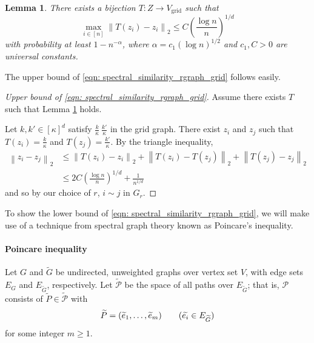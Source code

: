 \documentclass{article}
\newcommand{\norm}[1]{\left\lVert#1\right\rVert}
\newcommand{\1}{\mathbb{I}}
\newcommand{\Z}{Z} %
\newcommand{\grid}{\mathrm{grid}}
\theoremstyle{alden}
\theoremstyle{aldenthm}
\newtheorem{lemma}{Lemma}
\theoremstyle{definition}
\theoremstyle{remark}
\begin{document}
\begin{lemma}
	\label{lem: mass_transport_mapping}
	There exists a bijection $T: \Z \to V_{\grid}$ such that
	\begin{equation*}
	\max_{i \in [n]} \norm{T(z_i) - z_i}_2 \leq C\left(\frac{\log n}{n}\right)^{1/d}
	\end{equation*}
	with probability at least $1 - n^{-\alpha}$, where $\alpha = c_1 (\log n)^{1/2}$ and $c_1, C > 0$ are universal constants.
\end{lemma}

The upper bound of \eqref{eqn: spectral_similarity_rgraph_grid} follows easily.
\begin{proof}[Upper bound of \eqref{eqn: spectral_similarity_rgraph_grid}]
	Assume there exists $T$ such that Lemma \ref{lem: mass_transport_mapping} holds.
	
	Let $k, k' \in [\kappa]^d$ satisfy $\frac{k}{\kappa} ~ \frac{k'}{\kappa}$  in the grid graph. There exist $z_i$ and $z_j$ such that $T(z_i) = \frac{k}{\kappa}$ and $T(z_j) = \frac{k'}{\kappa}$. By the triangle inequality,
	\begin{align*}
	\norm{z_i - z_j}_2 & \leq \norm{T(z_i) - z_i}_2 + \norm{T(z_i) - T(z_j)}_2 + \norm{T(z_j) - z_j}_2 \\
	& \leq 2C\left(\frac{\log n}{n}\right)^{1/d} + \frac{1}{n^{1/d}}
	\end{align*}
	and so by our choice of $r$, $i \sim j$ in $G_r$.
\end{proof}

To show the lower bound of \eqref{eqn: spectral_similarity_rgraph_grid}, we will make use of a technique from spectral graph theory known as Poincare's inequality.

\paragraph{Poincare inequality}

Let $G$ and $\widetilde{G}$ be undirected, unweighted graphs over vertex set $V$, with edge sets $E_G$ and $E_{\widetilde{G}}$, respectively. Let $\widetilde{\mathcal{P}}$ be the space of all paths over $E_{\widetilde{G}}$; that is, $\mathcal{P}$ consists of $\widetilde{P} \in \widetilde{\mathcal{P}}$ with
\begin{equation*}
\widetilde{P} = (\widetilde{e}_1, \ldots, \widetilde{e}_m) \tag{$\widetilde{e_i} \in E_{\widetilde{G}}$}
\end{equation*}
for some integer $m \geq 1$.
\end{document}
